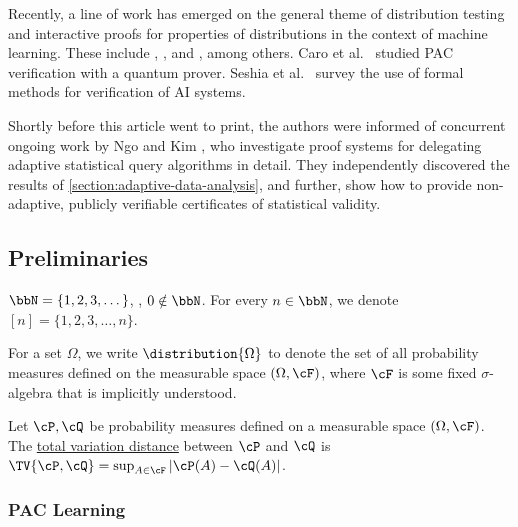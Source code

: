 \documentclass{toc}
\begin{document}
Recently, %
a line of work has emerged  %
on the general theme of distribution testing and interactive proofs for properties of distributions in the context of machine learning. These include \cite{CanettiK21}, \cite{abs-2108-12099}, \cite{abs-2204-07196} and \cite{HermanR22}, among others. Caro et al.\ \cite{DBLP:journals/corr/abs-2306-04843} studied PAC verification with a quantum prover. Seshia et al.\ \cite{DBLP:journals/cacm/SeshiaSS22} survey the use of formal methods for verification of AI systems.

Shortly before this article went to print, the authors were informed of concurrent ongoing work by Ngo and Kim \cite{NgoKim}, who investigate proof systems for delegating adaptive statistical query algorithms in detail. They independently discovered the results of \cref{section:adaptive-data-analysis}, and further, show how to provide non-adaptive, publicly verifiable certificates of statistical validity.


\subsection{Preliminaries}\label{section:preliminaries}

\begin{notation}
	$\bbN = \{1,2,3,\dots\}$, \ie, $0 \notin \bbN$. For every $n \in \bbN$, we denote $[n] = \{1,2,3,\dots,n\}$.
\end{notation}

\begin{notation}
	For a set $\Omega$, we write $\distribution{\Omega}$ to denote the set of all probability measures defined on the measurable space $(\Omega,\cF)$, where $\cF$ is some fixed $\sigma$-algebra that is implicitly understood. 
\end{notation}

\begin{definition}
	Let $\cP,\cQ$ be probability measures defined on a measurable space $(\Omega,\cF)$. The \ul{total variation distance} between $\cP$ and $\cQ$ is $\TV{\cP,\cQ} = \sup_{A \in \cF} |\cP(A)-\cQ(A)|$.
\end{definition}

\subsubsection*{PAC Learning}

\end{document}
